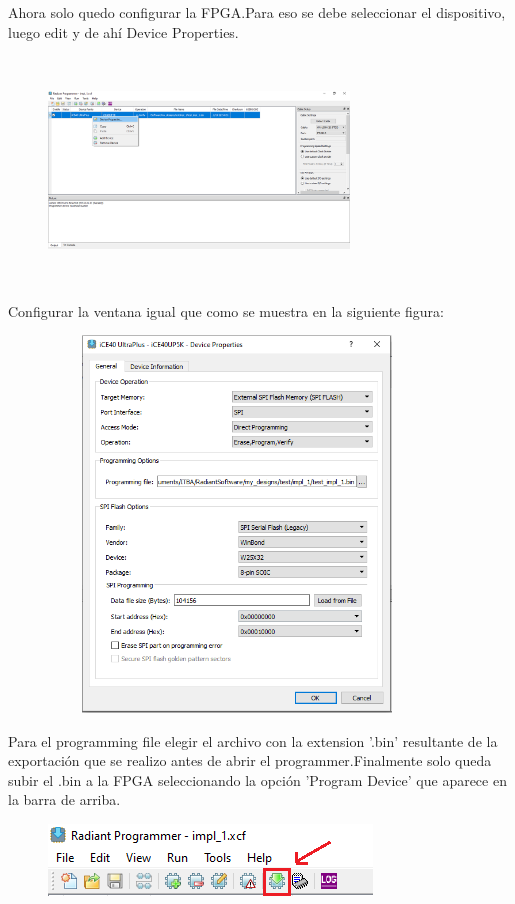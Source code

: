 \documentclass{article}
\begin{document}
Ahora solo quedo configurar la FPGA.Para eso se debe seleccionar el dispositivo, luego edit y de ahí Device Properties.
	\begin{figure}[H]
 	\centering
	\includegraphics[height=6cm, width=8cm]{Imagenes/EditProg.png}
	\end{figure}
Configurar la ventana igual que como se muestra en la siguiente figura:
	\begin{figure}[H]
 	\centering
	\includegraphics[height=10cm, width=10cm]{Imagenes/Config.png}
	\end{figure}
Para el programming file elegir el archivo con la extension '.bin' resultante de la exportación que se realizo antes de abrir el programmer.Finalmente solo queda subir el .bin a la FPGA seleccionando la opción 'Program Device' que aparece en la barra de arriba.
	\begin{figure}[H]
 	\centering
	\includegraphics[width=\textwidth]{Imagenes/runprog.png}
	\end{figure}
\end{document}
